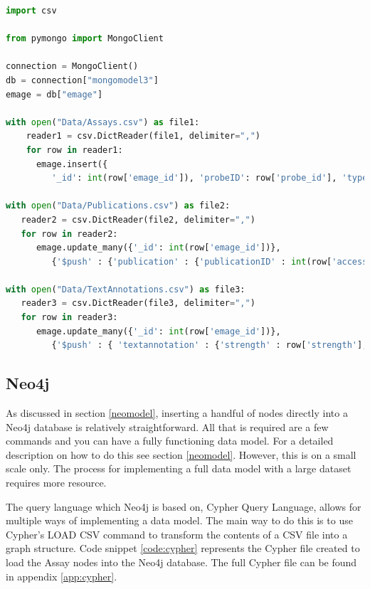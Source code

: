 \begin{lstlisting}[language=Python, caption=PyMongo script implemented to load data into MongoDB., label=code:pymongo]
import csv

from pymongo import MongoClient

connection = MongoClient()
db = connection["mongomodel3"]
emage = db["emage"]

with open("Data/Assays.csv") as file1:
    reader1 = csv.DictReader(file1, delimiter=",")
    for row in reader1:
      emage.insert({
         '_id': int(row['emage_id']), 'probeID': row['probe_id'], 'type': row['assay_type'], 'source': row['name'], 'specimen' : {'type':row['type'],'strain' : row['strain']}, 'stage' : {'theilerstage' : int(row['theilerstage']),'dpc' : row['dpc']}})
         
with open("Data/Publications.csv") as file2:
   reader2 = csv.DictReader(file2, delimiter=",")
   for row in reader2:
      emage.update_many({'_id': int(row['emage_id'])},
         {'$push' : {'publication' : {'publicationID' : int(row['accession']), 'title' : row['title'], 'author' : row['author']}}}, upsert=False)
         
with open("Data/TextAnnotations.csv") as file3:
   reader3 = csv.DictReader(file3, delimiter=",")
   for row in reader3:
      emage.update_many({'_id': int(row['emage_id'])},
         {'$push' : { 'textannotation' : {'strength' : row['strength'], 'anatomystructure' : {'structureID' : int(row['EMAPA']),'term' : row['term']}, 'gene' : {'geneID' : row['accession'],'name' : row['name']}}}}, upsert=False)
\end{lstlisting}
\vspace*{\fill}
\newpage
\subsection{Neo4j}
As discussed in section \ref{neomodel}, inserting a handful of nodes directly into a Neo4j database is relatively straightforward. All that is required are a few commands and you can have a fully functioning data model. For a detailed description on how to do this see section \ref{neomodel}. However, this is on a small scale only. The process for implementing a full data model with a large dataset requires more resource.

The query language which Neo4j is based on, Cypher Query Language, allows for multiple ways of implementing a data model. The main way to do this is to use Cypher's LOAD CSV command to transform the contents of a CSV file into a graph structure. Code snippet \ref{code:cypher} represents the Cypher file created to load the Assay nodes into the Neo4j database. The full Cypher file can be found in appendix \ref{app:cypher}.

